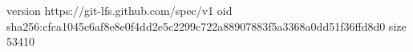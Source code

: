 version https://git-lfs.github.com/spec/v1
oid sha256:cfca1045c6af8e8e0f4dd2e5c2299c722a88907883f5a3368a0dd51f36ffd8d0
size 53410
